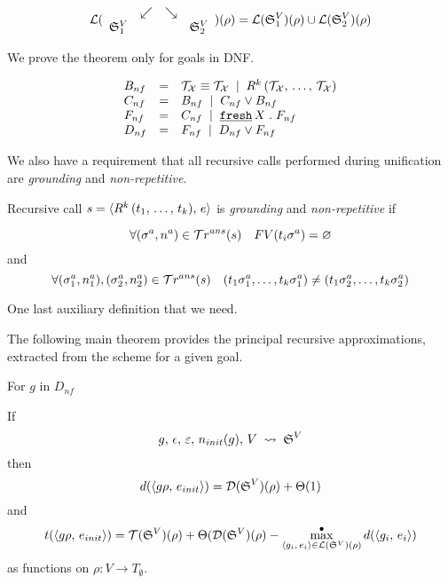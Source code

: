 \[ \mathcal{L}(\begin{array}{cccc} & \swarrow & \searrow \\ \mathfrak{S}_1^{V} & & & \mathfrak{S}_2^{V} \end{array})(\rho) =
      \mathcal{L}(\mathfrak{S}_1^{V})(\rho) \cup \mathcal{L}(\mathfrak{S}_2^{V})(\rho) \]

We prove the theorem only for goals in DNF.

\[
\begin{array}{lcl}
B_{nf} & = &  \mathcal{T}_\mathcal{X} \equiv \mathcal{T}_\mathcal{X} \; \mid \;
                     R^k\,(\mathcal{T}_\mathcal{X}, \, \dots, \, \mathcal{T}_\mathcal{X}) \\
C_{nf} & = & B_{nf} \; \mid \; C_{nf} \lor B_{nf} \\
F_{nf} & = & C_{nf} \; \mid \; \texttt{\underline {fresh}} \, X\;.\; F_{nf} \\
D_{nf} & = & F_{nf} \; \mid \; D_{nf} \lor F_{nf}
\end{array}
\]

We also have a requirement that all recursive calls performed during unification are \emph{grounding} and \emph{non-repetitive}.

\begin{definition}
Recursive call $s = \langle R^k\,(t_1, \, \dots, \, t_k) ,\, e \rangle$ is \emph{grounding} and \emph{non-repetitive} if 

\[ \forall (\sigma^{a}, n^{a}) \in \mathcal{T}r^{ans}(s) \quad FV(t_i \sigma^{a}) = \varnothing \]
and
\[ \forall (\sigma_1^{a}, n_1^{a}), (\sigma_2^{a}, n_2^{a}) \in \mathcal{T}r^{ans}(s) \quad (t_1 \sigma_1^{a}, \dots, t_k \sigma_1^{a}) \ne (t_1 \sigma_2^{a}, \dots, t_k \sigma_2^{a}) \]
\end{definition}

One last auxiliary definition that we need.

The following main theorem provides the principal recursive approximations, extracted from the scheme for a given goal.
 
\begin{theorem}
For $g$ in $D_{nf}$ 

If \[  g, \, \epsilon, \, \varepsilon, \, n_{init}(g), \, V \; \rightsquigarrow \; \mathfrak{S}^{V}  \]
  then \[ d(\langle g\rho ,\, e_{init} \rangle) = \mathcal{D}(\mathfrak{S}^{V})(\rho) + \Theta(1) \]
  and
  \[ t(\langle g\rho ,\, e_{init} \rangle) = \mathcal{T}(\mathfrak{S}^{V})(\rho) + \Theta(\mathcal{D}(\mathfrak{S}^{V})(\rho)
  - \max^{\bullet}\limits_{\langle g_i ,\, e_i \rangle \in \mathcal{L}(\mathfrak{S}^{V})(\rho)} d(\langle g_i ,\, e_i \rangle) \]
  as functions on $\rho \colon V \to T_{\emptyset}$.
\end{theorem}

